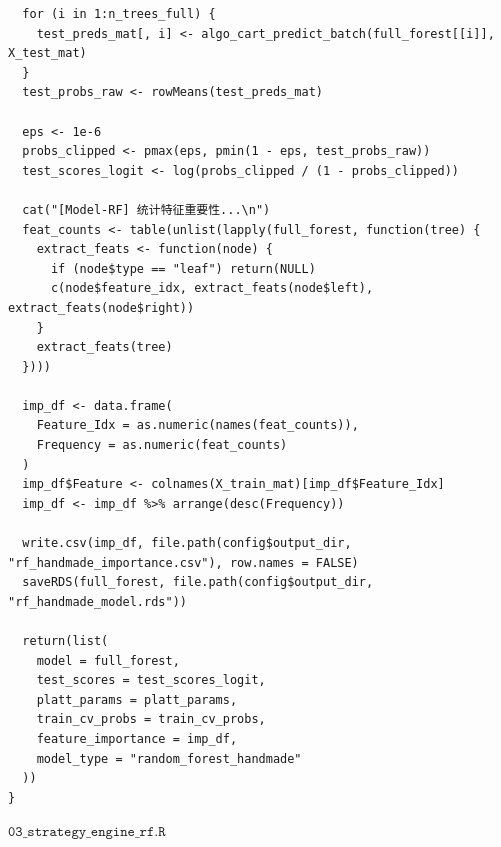 \documentclass[11pt, a4paper]{article}
\begin{document}
\begin{verbatim}
  for (i in 1:n_trees_full) {
    test_preds_mat[, i] <- algo_cart_predict_batch(full_forest[[i]], X_test_mat)
  }
  test_probs_raw <- rowMeans(test_preds_mat)
  
  eps <- 1e-6
  probs_clipped <- pmax(eps, pmin(1 - eps, test_probs_raw))
  test_scores_logit <- log(probs_clipped / (1 - probs_clipped))

  cat("[Model-RF] 统计特征重要性...\n")
  feat_counts <- table(unlist(lapply(full_forest, function(tree) {
    extract_feats <- function(node) {
      if (node$type == "leaf") return(NULL)
      c(node$feature_idx, extract_feats(node$left), extract_feats(node$right))
    }
    extract_feats(tree)
  })))
  
  imp_df <- data.frame(
    Feature_Idx = as.numeric(names(feat_counts)),
    Frequency = as.numeric(feat_counts)
  )
  imp_df$Feature <- colnames(X_train_mat)[imp_df$Feature_Idx]
  imp_df <- imp_df %>% arrange(desc(Frequency))
  
  write.csv(imp_df, file.path(config$output_dir, "rf_handmade_importance.csv"), row.names = FALSE)
  saveRDS(full_forest, file.path(config$output_dir, "rf_handmade_model.rds"))
  
  return(list(
    model = full_forest,
    test_scores = test_scores_logit,
    platt_params = platt_params, 
    train_cv_probs = train_cv_probs,
    feature_importance = imp_df,
    model_type = "random_forest_handmade"
  ))
} 
\end{verbatim}
$\texttt{03\_strategy\_engine\_rf.R}$
\end{document}
